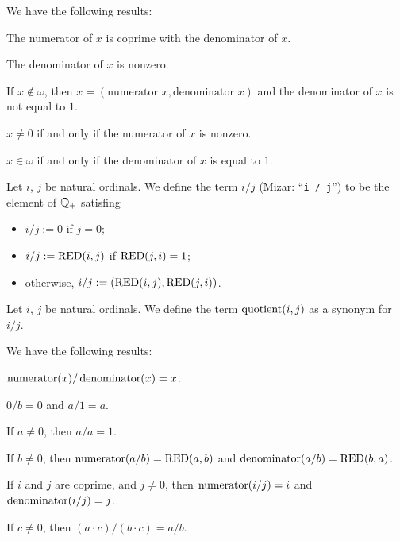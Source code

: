 \documentclass{article}
\begin{document}
We have the following results:
\begin{thm}
\item\label{arytm3:34} The numerator of $x$ is coprime with the
  denominator of $x$.
\item\label{arytm3:35} The denominator of $x$ is nonzero.
\item\label{arytm3:36} If $x\notin\omega$, then
  $x=(\mbox{numerator }x,\mbox{denominator }x)$ and the denominator of
  $x$ is not equal to $1$.
\item\label{arytm3:37} $x\neq0$ if and only if the numerator of $x$ is
  nonzero.
\item\label{arytm3:38} $x\in\omega$ if and only if the denominator of
  $x$ is equal to $1$.
\end{thm}

\begin{definition}
Let $i$, $j$ be natural ordinals.
We define the term $i/j$ (Mizar: ``\verb#i / j#'')
to be the element of $\mathbb{Q}_{+}$ satisfing
\begin{defn}
\item \begin{itemize}
\item $i/j := 0$ if $j=0$;
\item $i/j := \operatorname{RED}(i,j)$ if $\operatorname{RED}(j,i)=1$;
\item otherwise, $i/j := (\operatorname{RED}(i,j), \operatorname{RED}(j,i))$.
\end{itemize}
\end{defn}
\end{definition}

\begin{notation}
Let $i$, $j$ be natural ordinals. We define the term $\operatorname{quotient}(i,j)$ as
a synonym for $i/j$.
\end{notation}

We have the following results:
\begin{thm}
\item\label{arytm3:39} $\operatorname{numerator}(x)/\operatorname{denominator}(x)=x$.
\item\label{arytm3:40} $0/b=0$ and $a/1=a$.
\item\label{arytm3:41} If $a\neq0$, then $a/a=1$.
\item\label{arytm3:42} If $b\neq0$, then $\operatorname{numerator}(a/b)=\operatorname{RED}(a,b)$ and $\operatorname{denominator}(a/b)=\operatorname{RED}(b,a)$.
\item\label{arytm3:43} If $i$ and $j$ are coprime, and $j\neq0$, then
  $\operatorname{numerator}(i/j)=i$ and $\operatorname{denominator}(i/j)=j$.
\item\label{arytm3:44} If $c\neq0$, then $(a\cdot c)/(b\cdot c)=a/b$.
\end{thm}
\end{document}
